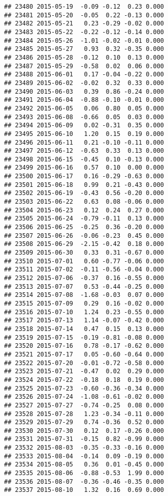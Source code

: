 \documentclass[
]{article}
\begin{document}
\begin{verbatim}
## 23480 2015-05-19  -0.09 -0.12  0.23 0.000
## 23481 2015-05-20  -0.05  0.22 -0.13 0.000
## 23482 2015-05-21   0.23 -0.29 -0.02 0.000
## 23483 2015-05-22  -0.22 -0.12 -0.14 0.000
## 23484 2015-05-26  -1.01 -0.02 -0.01 0.000
## 23485 2015-05-27   0.93  0.32 -0.35 0.000
## 23486 2015-05-28  -0.12  0.10  0.13 0.000
## 23487 2015-05-29  -0.58  0.02  0.06 0.000
## 23488 2015-06-01   0.17 -0.04 -0.22 0.000
## 23489 2015-06-02  -0.02  0.32  0.33 0.000
## 23490 2015-06-03   0.39  0.86 -0.24 0.000
## 23491 2015-06-04  -0.88 -0.10 -0.01 0.000
## 23492 2015-06-05   0.06  0.80  0.05 0.000
## 23493 2015-06-08  -0.66  0.05  0.03 0.000
## 23494 2015-06-09   0.02 -0.31  0.35 0.000
## 23495 2015-06-10   1.20  0.15  0.19 0.000
## 23496 2015-06-11   0.21 -0.10 -0.11 0.000
## 23497 2015-06-12  -0.63  0.33  0.13 0.000
## 23498 2015-06-15  -0.45  0.10 -0.13 0.000
## 23499 2015-06-16   0.57  0.10  0.00 0.000
## 23500 2015-06-17   0.16 -0.29 -0.63 0.000
## 23501 2015-06-18   0.99  0.21 -0.43 0.000
## 23502 2015-06-19  -0.43  0.56 -0.20 0.000
## 23503 2015-06-22   0.63  0.08 -0.06 0.000
## 23504 2015-06-23   0.12  0.24  0.27 0.000
## 23505 2015-06-24  -0.79 -0.11  0.13 0.000
## 23506 2015-06-25  -0.25  0.36 -0.20 0.000
## 23507 2015-06-26  -0.06 -0.23  0.45 0.000
## 23508 2015-06-29  -2.15 -0.42  0.18 0.000
## 23509 2015-06-30   0.33  0.31 -0.67 0.000
## 23510 2015-07-01   0.60 -0.77 -0.06 0.000
## 23511 2015-07-02  -0.11 -0.56 -0.04 0.000
## 23512 2015-07-06  -0.37  0.16 -0.55 0.000
## 23513 2015-07-07   0.53 -0.44 -0.25 0.000
## 23514 2015-07-08  -1.68 -0.03  0.07 0.000
## 23515 2015-07-09   0.29  0.16 -0.02 0.000
## 23516 2015-07-10   1.24  0.23 -0.55 0.000
## 23517 2015-07-13   1.14 -0.07 -0.42 0.000
## 23518 2015-07-14   0.47  0.15  0.13 0.000
## 23519 2015-07-15  -0.19 -0.81 -0.08 0.000
## 23520 2015-07-16   0.78 -0.17 -0.62 0.000
## 23521 2015-07-17   0.05 -0.60 -0.64 0.000
## 23522 2015-07-20  -0.01 -0.72 -0.58 0.000
## 23523 2015-07-21  -0.47  0.02  0.29 0.000
## 23524 2015-07-22  -0.18  0.18  0.19 0.000
## 23525 2015-07-23  -0.60 -0.36 -0.34 0.000
## 23526 2015-07-24  -1.08 -0.61 -0.02 0.000
## 23527 2015-07-27  -0.74 -0.25  0.08 0.000
## 23528 2015-07-28   1.23 -0.34 -0.11 0.000
## 23529 2015-07-29   0.74 -0.36  0.52 0.000
## 23530 2015-07-30   0.12  0.17 -0.26 0.000
## 23531 2015-07-31  -0.15  0.82 -0.99 0.000
## 23532 2015-08-03  -0.35 -0.33 -0.16 0.000
## 23533 2015-08-04  -0.14  0.09 -0.19 0.000
## 23534 2015-08-05   0.36  0.01 -0.45 0.000
## 23535 2015-08-06  -0.88 -0.53  1.99 0.000
## 23536 2015-08-07  -0.36 -0.46 -0.35 0.000
## 23537 2015-08-10   1.32  0.16  0.69 0.000

\end{verbatim}
\end{document}
